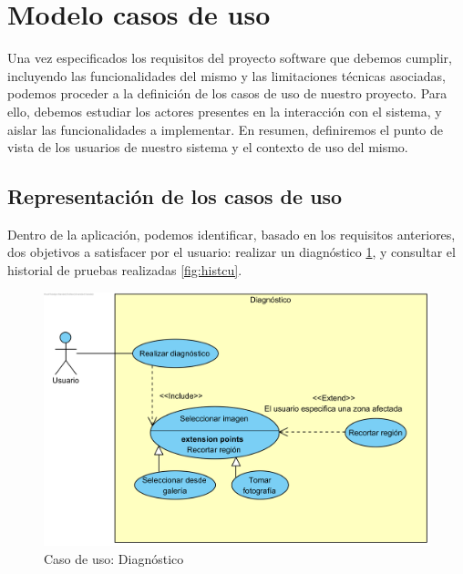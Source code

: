 \section{Modelo casos de uso}

Una vez especificados los requisitos del proyecto software que debemos cumplir, incluyendo las funcionalidades del mismo y las limitaciones técnicas asociadas, podemos proceder a la definición de los casos de uso de nuestro proyecto. Para ello, debemos estudiar los actores presentes en la interacción con el sistema, y aislar las funcionalidades a implementar. En resumen, definiremos el punto de vista de los usuarios de nuestro sistema y el contexto de uso del mismo.

 \subsection{Representación de los casos de uso}
 
 Dentro de la aplicación, podemos identificar, basado en los requisitos anteriores, dos objetivos a satisfacer por el usuario: realizar un diagnóstico \ref{fig:diagcu}, y consultar el historial de pruebas realizadas \ref{fig:histcu}.
 
 \begin{figure}[H]
 	\centering
 	\includegraphics[scale = 0.9]{imagenes/TomarFoto.png}
 	\caption{Caso de uso: Diagnóstico}
 	\label{fig:diagcu}
 \end{figure}
 
